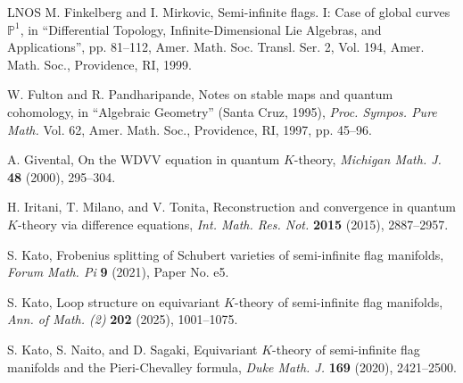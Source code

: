 \documentclass[11pt,a4paper,reqno,dvipdfmx]{amsart}
\numberwithin{equation}{section}
\theoremstyle{plain}
\theoremstyle{definition}
\theoremstyle{remark}
\begin{document}
\begin{thebibliography}{LNOS}
M. Finkelberg and I. Mirkovic, 
Semi-infinite flags. I: Case of global curves $\mathbb{P}^{1}$, 
in ``Differential Topology, Infinite-Dimensional Lie Algebras, and Applications'', pp. 81--112, 
Amer. Math. Soc. Transl. Ser. 2, Vol. 194, 
Amer. Math. Soc., Providence, RI, 1999.

W. Fulton and R. Pandharipande, Notes on stable maps and 
quantum cohomology, in ``Algebraic Geometry'' (Santa Cruz, 1995), 
\textit{Proc. Sympos. Pure Math.} Vol. 62, 
Amer. Math. Soc., Providence, RI, 1997, pp. 45--96. 

A. Givental, On the WDVV equation in quantum $K$-theory, 
\textit{Michigan Math. J.} \textbf{48} (2000), 295--304.

%

H. Iritani, T. Milano, and V. Tonita, 
Reconstruction and convergence in quantum $K$-theory via difference equations,
\textit{Int. Math. Res. Not.} \textbf{2015} (2015), 2887--2957.


S. Kato, Frobenius splitting of Schubert varieties of semi-infinite flag manifolds, 
\textit{Forum Math. Pi} \textbf{9} (2021), Paper No. e5. 

S. Kato, Loop structure on equivariant $K$-theory 
of semi-infinite flag manifolds, 
\textit{Ann. of Math. (2)} \textbf{202} (2025), 1001--1075.

%

S. Kato, S. Naito, and D. Sagaki,
Equivariant $K$-theory of semi-infinite flag manifolds and the Pieri-Chevalley formula, 
\textit{Duke Math. J.} \textbf{169} (2020), 2421--2500. 


\end{thebibliography}
\end{document}
